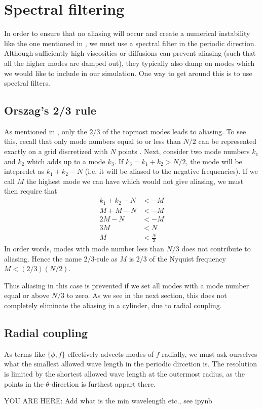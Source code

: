 \section{Spectral filtering}
%
In order to ensure that no aliasing will occur and create a numerical instability like the one mentioned in \cite{Phillips1959}, we must use a spectral filter in the periodic direction.
Although sufficiently high viscosities or diffusions can prevent aliasing (such that all the higher modes are damped out), they typically also damp on modes which we would like to include in our simulation.
One way to get around this is to use spectral filters.

\subsection{Orszag's 2/3 rule}
As mentioned in \cite{Orszag1971}, only the $2/3$ of the topmost modes leads to aliasing.
To see this, recall that only mode numbers equal to or less than $N/2$ can be represented exactly on a grid discretized with $N$ points \cite{Bracewell2000book}.
Next, consider two mode numbers $k_1$ and $k_2$ which adds up to a mode $k_3$.
If $k_3=k_1+k_2>N/2$, the mode will be intepredet as $k_1+k_2 - N$ (i.e. it will be aliased to the negative frequencies).
If we call $M$ the highest mode we can have which would not give aliasing, we must then require that
%
\begin{align*}
    k_1+k_2 - N &< -M\\
    M + M - N &< -M\\
    2M - N &< -M\\
    3M &<  N\\
    M &< \frac{N}{3}
\end{align*}
%
In order words, modes with mode number less than $N/3$ does not contribute to aliasing.
Hence the name $2/3$-rule as $M$ is $2/3$ of the Nyquist frequency $M < (2/3)(N/2)$.

Thus aliasing in this case is prevented if we set all modes with a mode number equal or above $N/3$ to zero.
As we see in the next section, this does not completely eliminate the aliasing in a cylinder, due to radial coupling.

\subsection{Radial coupling}
%
As terms like $\{\phi, f\}$ effectively advects modes of $f$ radially, we must ask ourselves what the smallest allowed wave length in the periodic dircetion is.
The resolution is limited by the shortest allowed wave length at the outermost radius, as the points in the $\theta$-direction is furthest appart there.


YOU ARE HERE: Add what is the min wavelength etc., see ipynb

